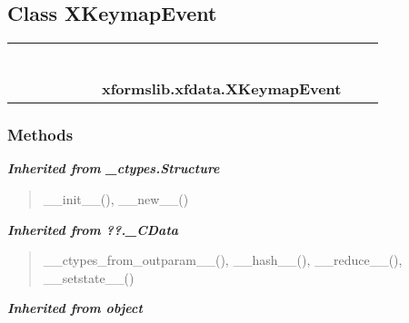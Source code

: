 \subsection{Class XKeymapEvent}

    \label{xformslib:xfdata:XKeymapEvent}
\begin{tabular}{cccccccccc}
\multicolumn{2}{r}{\settowidth{\BCL}{object}\multirow{2}{\BCL}{object}}
&&
&&
&&
  \\\cline{3-3}
  &&\multicolumn{1}{c|}{}
&&
&&
&&
  \\
\multicolumn{4}{r}{\settowidth{\BCL}{??.\_CData}\multirow{2}{\BCL}{??.\_CData}}
&&
&&
  \\\cline{5-5}
  &&&&\multicolumn{1}{c|}{}
&&
&&
  \\
\multicolumn{6}{r}{\settowidth{\BCL}{\_ctypes.Structure}\multirow{2}{\BCL}{\_ctypes.Structure}}
&&
  \\\cline{7-7}
  &&&&&&\multicolumn{1}{c|}{}
&&
  \\
&&&&&&\multicolumn{2}{l}{\textbf{xformslib.xfdata.XKeymapEvent}}
\end{tabular}



  \subsubsection{Methods}


\large{\textbf{\textit{Inherited from \_ctypes.Structure}}}

\begin{quote}
\_\_init\_\_(), \_\_new\_\_()
\end{quote}

\large{\textbf{\textit{Inherited from ??.\_CData}}}

\begin{quote}
\_\_ctypes\_from\_outparam\_\_(), \_\_hash\_\_(), \_\_reduce\_\_(), \_\_setstate\_\_()
\end{quote}

\large{\textbf{\textit{Inherited from object}}}

